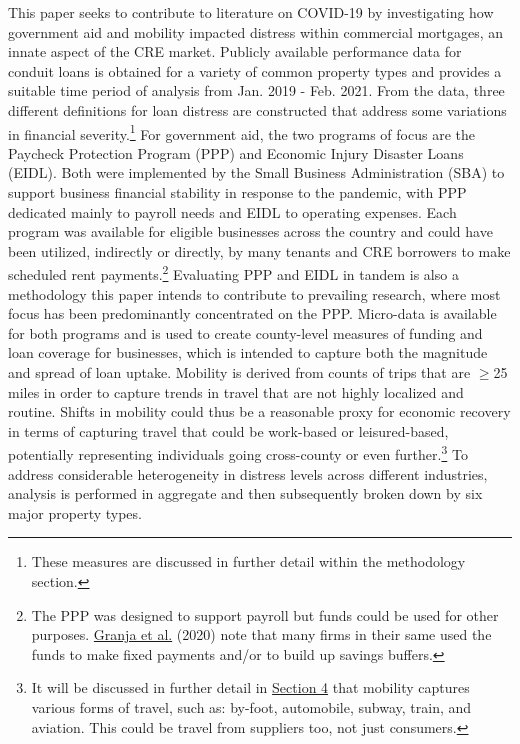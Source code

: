 \documentclass[11pt]{article} %
\begin{document}
This paper seeks to contribute to literature on COVID-19 by investigating how government aid and mobility impacted distress within commercial mortgages, an innate aspect of the CRE market. Publicly available performance data for conduit loans is obtained for a variety of common property types and provides a suitable time period of analysis from Jan. 2019 - Feb. 2021. From the data, three different definitions for loan distress are constructed that address some variations in financial severity.\footnote{These measures are discussed in further detail within the methodology section.} For government aid, the two programs of focus are the Paycheck Protection Program (PPP) and Economic Injury Disaster Loans (EIDL). Both were implemented by the Small Business Administration (SBA) to support business financial stability in response to the pandemic, with PPP dedicated mainly to payroll needs and EIDL to operating expenses. Each program was available for eligible businesses across the country and could have been utilized, indirectly or directly, by many tenants and CRE borrowers to make scheduled rent payments.\footnote{The PPP was designed to support payroll but funds could be used for other purposes. \hyperlink{Granja}{Granja et al.} (2020) note that many firms in their same used the funds to make fixed payments and/or to build up savings buffers.} Evaluating PPP and EIDL in tandem is also a methodology this paper intends to contribute to prevailing research, where most focus has been predominantly concentrated on the PPP. Micro-data is available for both programs and is used to create county-level measures of funding and loan coverage for businesses, which is intended to capture both the magnitude and spread of loan uptake. Mobility is derived from counts of trips that are $\geq$25 miles in order to capture trends in travel that are not highly localized and routine. Shifts in mobility could thus be a reasonable proxy for economic recovery in terms of capturing travel that could be work-based or leisured-based, potentially representing individuals going cross-county or even further.\footnote{It will be discussed in further detail in \hyperlink{Data}{Section 4} that mobility captures various forms of travel, such as: by-foot, automobile, subway, train, and aviation. This could be travel from suppliers too, not just consumers.} To address considerable heterogeneity in distress levels across different industries, analysis is performed in aggregate and then subsequently broken down by six major property types.     
\end{document}
